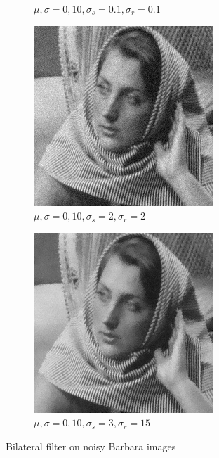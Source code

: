 \documentclass[a4paper, landscape]{article}
\begin{document}
\begin{figure}
\begin{subfigure}{0.33\linewidth}
        \caption{$\mu, \sigma = 0, 10, \sigma_s=0.1, \sigma_r=0.1$}
    \end{subfigure}
    \begin{subfigure}{0.33\linewidth}
        \centering
        \includegraphics[width=\linewidth]{barbara256,σ_noise10,σ_spatial2,σ_range2.png}
        \caption{$\mu, \sigma = 0, 10, \sigma_s=2, \sigma_r=2$}
    \end{subfigure}
    \begin{subfigure}{0.33\linewidth}
        \centering
        \includegraphics[width=\linewidth]{barbara256,σ_noise10,σ_spatial3,σ_range15.png}
        \caption{$\mu, \sigma = 0, 10, \sigma_s=3, \sigma_r=15$}
    \end{subfigure}
    \caption{Bilateral filter on noisy Barbara images}
    \label{fig:bn}
\end{figure}
\end{document}
